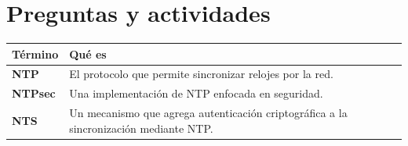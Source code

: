 \documentclass[12pt,a4paper]{article}
\begin{document}
\section{Preguntas y actividades}
\begingroup
\renewcommand{\arraystretch}{1.4}
\begin{tabularx}{\linewidth}{@{}p{2.5cm}>{\RaggedRight\arraybackslash}X@{}}
\toprule
\textbf{Término} & \textbf{Qué es} \\
\midrule
\textbf{NTP} & El protocolo que permite sincronizar relojes por la red. \\
\textbf{NTPsec} & Una implementación de NTP enfocada en seguridad. \\
\textbf{NTS} & Un mecanismo que agrega autenticación criptográfica a la sincronización mediante NTP. \\
\bottomrule
\end{tabularx}
\endgroup
\end{document}

